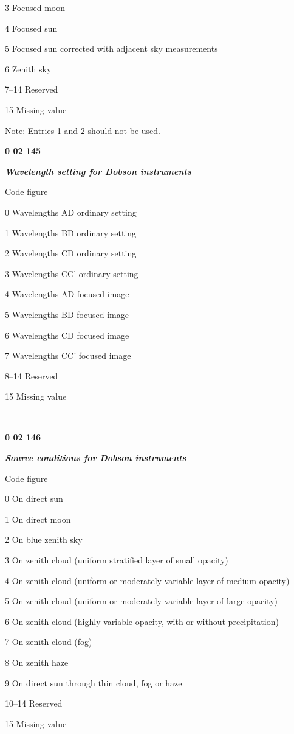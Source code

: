 3 Focused moon

4 Focused sun

5 Focused sun corrected with adjacent sky measurements

6 Zenith sky

7--14 Reserved

15 Missing value

Note: Entries 1 and 2 should not be used.

\textbf{0 02 145}

\emph{\textbf{Wavelength setting for Dobson instruments}}

Code figure

0 Wavelengths AD ordinary setting

1 Wavelengths BD ordinary setting

2 Wavelengths CD ordinary setting

3 Wavelengths CC' ordinary setting

4 Wavelengths AD focused image

5 Wavelengths BD focused image

6 Wavelengths CD focused image

7 Wavelengths CC' focused image

8--14 Reserved

15 Missing value

\textbf{\\
}

\textbf{0 02 146}

\emph{\textbf{Source conditions for Dobson instruments}}

Code figure

0 On direct sun

1 On direct moon

2 On blue zenith sky

3 On zenith cloud (uniform stratified layer of small opacity)

4 On zenith cloud (uniform or moderately variable layer of medium opacity)

5 On zenith cloud (uniform or moderately variable layer of large opacity)

6 On zenith cloud (highly variable opacity, with or without precipitation)

7 On zenith cloud (fog)

8 On zenith haze

9 On direct sun through thin cloud, fog or haze

10--14 Reserved

15 Missing value

